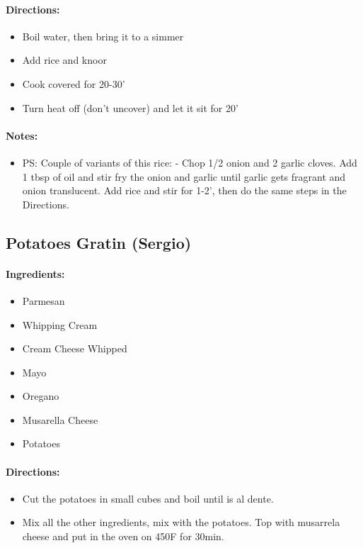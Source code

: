 \documentclass{article}
\begin{document}
\paragraph{Directions:}
\begin{itemize}
    \item Boil water, then bring it to a simmer
    \item Add rice and knoor
    \item Cook covered for 20-30'
    \item Turn heat off (don't uncover) and let it sit for 20'
\end{itemize}

\paragraph{Notes:}
\begin{itemize}
    \item PS: Couple of variants of this rice: - Chop 1/2 onion and 2 garlic cloves. Add 1 tbsp of oil and stir fry the onion and garlic until garlic gets fragrant and onion translucent. Add rice and stir for 1-2’, then do the same steps in the Directions.
\end{itemize}

\subsection{Potatoes Gratin (Sergio)}

\paragraph{Ingredients:}
\begin{itemize}
    \item Parmesan
    \item Whipping Cream
    \item Cream Cheese Whipped
    \item Mayo
    \item Oregano
    \item Musarella Cheese
    \item Potatoes
\end{itemize}

\paragraph{Directions:}
\begin{itemize}
    \item Cut the potatoes in small cubes and boil until is al dente.
    \item Mix all the other ingredients, mix with the potatoes. Top with musarrela cheese and put in the oven on 450F for 30min.
\end{itemize}
\end{document}
